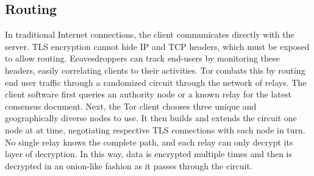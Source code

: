 \subsection{Routing}

In traditional Internet connections, the client communicates directly with the server. TLS encryption cannot hide IP and TCP headers, which must be exposed to allow routing. Eeavesdroppers can track end-users by monitoring these headers, easily correlating clients to their activities. Tor combats this by routing end user traffic through a randomized circuit through the network of relays. The client software first queries an authority node or a known relay for the latest consensus document. Next, the Tor client chooses three unique and geographically diverse nodes to use. It then builds and extends the circuit one node at at time, negotiating respective TLS connections with each node in turn. No single relay knows the complete path, and each relay can only decrypt its layer of decryption. In this way, data is encrypted multiple times and then is decrypted in an onion-like fashion as it passes through the circuit.


